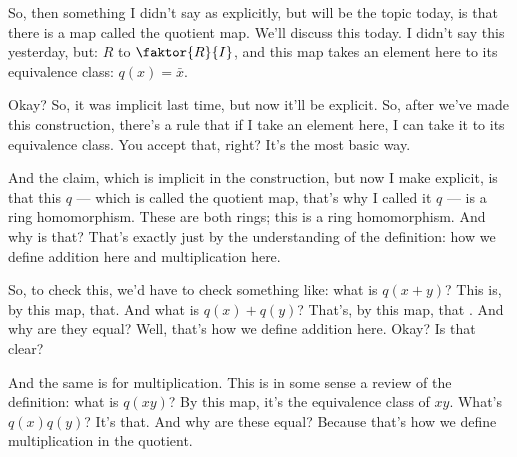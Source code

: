 \begin{speech}[00:01:10 - 00:02:45]
So, then something I didn't say as explicitly, but will be the topic today, is that there is a map called the quotient map. We'll discuss this today. I didn't say this yesterday, but:  $R$ to $\faktor{R}{I}$, and this map takes an element here to its equivalence class:  $q(x) = \bar{x}$.

Okay? So, it was implicit last time, but now it'll be explicit. So, after we've made this construction, there's a rule that if I take an element here, I can take it to its equivalence class. You accept that, right? It's the most basic way.

And the claim, which is implicit in the construction, but now I make explicit, is that this $q$ --- which is called the quotient map, that's why I called it $q$ --- is a ring homomorphism.  These are both rings; this is a ring homomorphism. And why is that? That's exactly just by the understanding of the definition: how we define addition here and multiplication here.

So, to check this, we'd have to check something like: what is $q(x + y)$?  This is, by this map, that. And what is $q(x) + q(y)$? That's, by this map, that . And why are they equal? Well, that's how we define addition here.  Okay? Is that clear?

And the same is for multiplication. This is in some sense a review of the definition: what is $q(xy)$? By this map, it's the equivalence class of $xy$.  What's $q(x) q(y)$?  It's that. And why are these equal? Because that's how we define multiplication in the quotient.
\end{speech}

